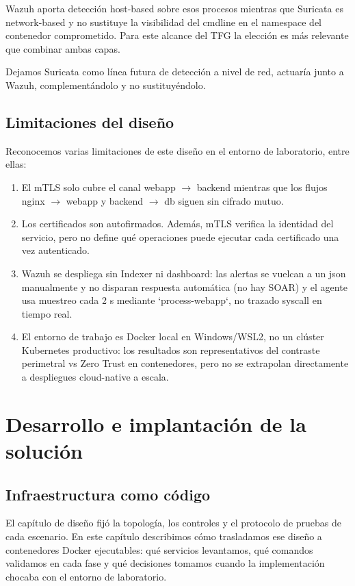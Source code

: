 \documentclass[11pt,spanish,listoffigures,listoftables]{tfgetsinf}
\begin{document}
    Wazuh aporta detección host-based sobre esos procesos mientras que Suricata es network-based y no sustituye la visibilidad del cmdline en el namespace del contenedor comprometido. Para este alcance del TFG la elección es más relevante que combinar ambas capas. 
    
    Dejamos Suricata como línea futura de detección a nivel de red, actuaría junto a Wazuh, complementándolo y no sustituyéndolo.
    
    \section{Limitaciones del diseño}
    \label{sec:4.4}
    Reconocemos varias limitaciones de este diseño en el entorno de laboratorio, entre ellas:

    \begin{enumerate}
        \item El mTLS solo cubre el canal webapp $\rightarrow$ backend mientras que los flujos nginx $\rightarrow$ webapp y backend $\rightarrow$ db siguen sin cifrado mutuo.
        \item Los certificados son autofirmados. Además, mTLS verifica la identidad del servicio, pero no define qué operaciones puede ejecutar cada certificado una vez autenticado.
        \item Wazuh se despliega sin Indexer ni dashboard: las alertas se vuelcan a un json manualmente y no disparan respuesta automática (no hay SOAR) y el agente usa muestreo cada 2 s mediante `process-webapp`, no trazado syscall en tiempo real.
        \item El entorno de trabajo es Docker local en Windows/WSL2, no un clúster Kubernetes productivo: los resultados son representativos del contraste perimetral vs Zero Trust en contenedores, pero no se extrapolan directamente a despliegues cloud-native a escala.
    \end{enumerate}


\chapter{Desarrollo e implantación de la solución}
    
    \section{Infraestructura como código}
    El capítulo de diseño fijó la topología, los controles y el protocolo de pruebas de cada escenario. En este capítulo describimos cómo trasladamos ese diseño a contenedores Docker ejecutables: qué servicios levantamos, qué comandos validamos en cada fase y qué decisiones tomamos cuando la implementación chocaba con el entorno de laboratorio.
    
\end{document}
